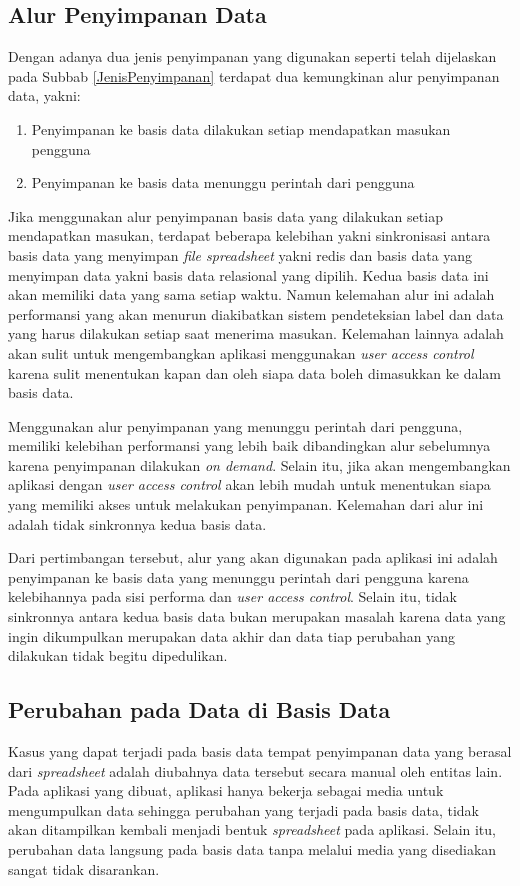 	\subsection{Alur Penyimpanan Data}
	Dengan adanya dua jenis penyimpanan yang digunakan seperti telah dijelaskan pada Subbab \ref{JenisPenyimpanan} terdapat dua kemungkinan alur penyimpanan data, yakni:
	\begin{enumerate}
		\item Penyimpanan ke basis data dilakukan setiap mendapatkan masukan pengguna
		\item Penyimpanan ke basis data menunggu perintah dari pengguna
	\end{enumerate}
	Jika menggunakan alur penyimpanan basis data yang dilakukan setiap mendapatkan masukan, terdapat beberapa kelebihan yakni sinkronisasi antara basis data yang menyimpan \textit{file spreadsheet} yakni redis dan basis data yang menyimpan data yakni basis data relasional yang dipilih. Kedua basis data ini akan memiliki data yang sama setiap waktu. Namun kelemahan alur ini adalah performansi yang akan menurun diakibatkan sistem pendeteksian label dan data yang harus dilakukan setiap saat menerima masukan. Kelemahan lainnya adalah akan sulit untuk mengembangkan aplikasi menggunakan \textit{user access control} karena sulit menentukan kapan dan oleh siapa data boleh dimasukkan ke dalam basis data.

	Menggunakan alur penyimpanan yang menunggu perintah dari pengguna, memiliki kelebihan performansi yang lebih baik dibandingkan alur sebelumnya karena penyimpanan dilakukan \textit{on demand}. Selain itu, jika akan mengembangkan aplikasi dengan \textit{user access control} akan lebih mudah untuk menentukan siapa yang memiliki akses untuk melakukan penyimpanan. Kelemahan dari alur ini adalah tidak sinkronnya kedua basis data.

	Dari pertimbangan tersebut, alur yang akan digunakan pada aplikasi ini adalah penyimpanan ke basis data yang menunggu perintah dari pengguna karena kelebihannya pada sisi performa dan \textit{user access control}. Selain itu, tidak sinkronnya antara kedua basis data bukan merupakan masalah karena data yang ingin dikumpulkan merupakan data akhir dan data tiap perubahan yang dilakukan tidak begitu dipedulikan.

	\subsection{Perubahan pada Data di Basis Data}
	Kasus yang dapat terjadi pada basis data tempat penyimpanan data yang berasal dari \textit{spreadsheet} adalah diubahnya data tersebut secara manual oleh entitas lain. Pada aplikasi yang dibuat, aplikasi hanya bekerja sebagai media untuk mengumpulkan data sehingga perubahan yang terjadi pada basis data, tidak akan ditampilkan kembali menjadi bentuk \textit{spreadsheet} pada aplikasi. Selain itu, perubahan data langsung pada basis data tanpa melalui media yang disediakan sangat tidak disarankan.

